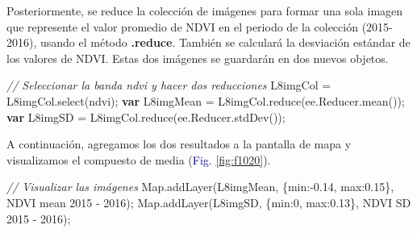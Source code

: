 \documentclass[
  12pt,
  letterpaper,
  twoside]{book}
\newenvironment{Shaded}{\begin{snugshade}}{\end{snugshade}}
\newcommand{\AttributeTok}[1]{\textcolor[rgb]{0.48,0.12,0.64}{#1}}
\newcommand{\CommentTok}[1]{\textcolor[rgb]{0.24,0.58,0.00}{\textit{#1}}}
\newcommand{\ControlFlowTok}[1]{\textcolor[rgb]{0.00,0.00,0.00}{\textbf{#1}}}
\newcommand{\DataTypeTok}[1]{\textcolor[rgb]{0.00,0.00,0.00}{#1}}
\newcommand{\DecValTok}[1]{\textcolor[rgb]{0.28,0.53,0.93}{#1}}
\newcommand{\FloatTok}[1]{\textcolor[rgb]{0.28,0.53,0.93}{#1}}
\newcommand{\FunctionTok}[1]{\textcolor[rgb]{0.48,0.12,0.64}{#1}}
\newcommand{\KeywordTok}[1]{\textcolor[rgb]{0.48,0.12,0.64}{#1}}
\newcommand{\NormalTok}[1]{#1}
\newcommand{\OperatorTok}[1]{\textcolor[rgb]{0.00,0.00,0.00}{#1}}
\newcommand{\StringTok}[1]{\textcolor[rgb]{0.87,0.29,0.22}{#1}}
\newcommand\boldpurple[1]{\textcolor{darkpurple}{\textbf{#1}}}
\begin{document}
Posteriormente, se reduce la colección de imágenes para formar una sola imagen que represente el valor promedio de NDVI en el periodo de la colección (2015-2016), usando el método \boldpurple{.reduce}. También se calculará la desviación estándar de los valores de NDVI. Estas dos imágenes se guardarán en dos nuevos objetos.

\begin{Shaded}
\begin{Highlighting}[]
\CommentTok{// Seleccionar la banda ndvi y hacer dos reducciones}
\NormalTok{L8imgCol }\OperatorTok{=}\NormalTok{ L8imgCol}\OperatorTok{.}\FunctionTok{select}\NormalTok{(}\StringTok{\textquotesingle{}ndvi\textquotesingle{}}\NormalTok{)}\OperatorTok{;}
\ControlFlowTok{var}\NormalTok{ L8imgMean }\OperatorTok{=}\NormalTok{ L8imgCol}\OperatorTok{.}\FunctionTok{reduce}\NormalTok{(}\KeywordTok{ee}\OperatorTok{.}\AttributeTok{Reducer}\OperatorTok{.}\FunctionTok{mean}\NormalTok{())}\OperatorTok{;}
\ControlFlowTok{var}\NormalTok{ L8imgSD }\OperatorTok{=}\NormalTok{ L8imgCol}\OperatorTok{.}\FunctionTok{reduce}\NormalTok{(}\KeywordTok{ee}\OperatorTok{.}\AttributeTok{Reducer}\OperatorTok{.}\FunctionTok{stdDev}\NormalTok{())}\OperatorTok{;}
\end{Highlighting}
\end{Shaded}

A continuación, agregamos los dos resultados a la pantalla de mapa y visualizamos el compuesto de media (\textcolor{darkblue}{Fig.} \ref{fig:f1020}).

\begin{Shaded}
\begin{Highlighting}[]
\CommentTok{// Visualizar las imágenes}
\KeywordTok{Map}\OperatorTok{.}\FunctionTok{addLayer}\NormalTok{(L8imgMean}\OperatorTok{,}\NormalTok{ \{}\DataTypeTok{min}\OperatorTok{:{-}}\FloatTok{0.14}\OperatorTok{,} \DataTypeTok{max}\OperatorTok{:}\FloatTok{0.15}\NormalTok{\}}\OperatorTok{,} \StringTok{\textquotesingle{}NDVI mean 2015 {-} 2016\textquotesingle{}}\NormalTok{)}\OperatorTok{;}
\KeywordTok{Map}\OperatorTok{.}\FunctionTok{addLayer}\NormalTok{(L8imgSD}\OperatorTok{,}\NormalTok{ \{}\DataTypeTok{min}\OperatorTok{:}\DecValTok{0}\OperatorTok{,} \DataTypeTok{max}\OperatorTok{:}\FloatTok{0.13}\NormalTok{\}}\OperatorTok{,} \StringTok{\textquotesingle{}NDVI SD 2015 {-} 2016\textquotesingle{}}\NormalTok{)}\OperatorTok{;}
\end{Highlighting}
\end{Shaded}
\end{document}
